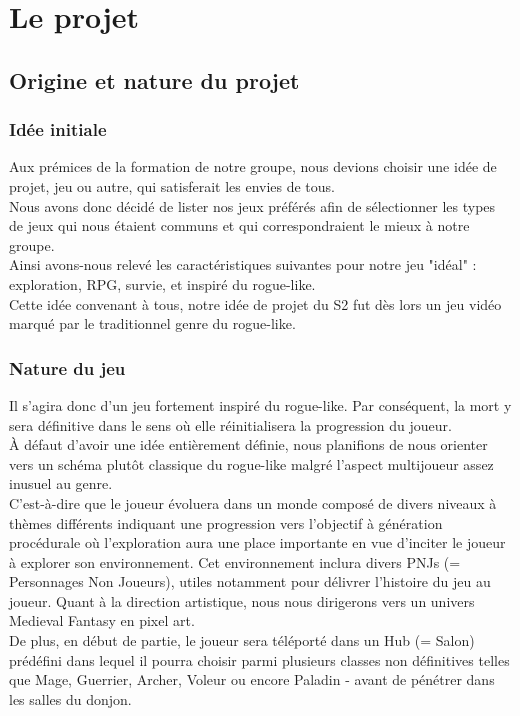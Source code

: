 \documentclass{article}
\begin{document}
\section{Le projet}

\subsection{Origine et nature du projet}


\subsubsection{Idée initiale}

Aux prémices de la formation de notre groupe, nous devions choisir une idée de projet, jeu ou autre, qui satisferait les envies de tous. \\
Nous avons donc décidé de lister nos jeux préférés afin de sélectionner les types de jeux qui nous étaient communs et qui correspondraient le mieux à notre groupe. \\
Ainsi avons-nous relevé les caractéristiques suivantes pour notre jeu "idéal" : exploration, RPG, survie, et inspiré du rogue-like. \\
Cette idée convenant à tous, notre idée de projet du S2 fut dès lors un jeu vidéo marqué par le traditionnel genre du rogue-like.

\subsubsection{Nature du jeu}

Il s'agira donc d'un jeu fortement inspiré du rogue-like.
Par conséquent, la mort y sera définitive dans le sens où elle réinitialisera la progression du joueur. \\
À défaut d'avoir une idée entièrement définie, nous planifions de nous orienter vers un schéma plutôt classique du rogue-like malgré l'aspect multijoueur assez inusuel au genre. \\
C'est-à-dire que le joueur évoluera dans un monde composé de divers niveaux à thèmes différents indiquant une progression vers l'objectif à génération procédurale où l'exploration aura une place importante en vue d'inciter le joueur à explorer son environnement. Cet environnement inclura divers PNJs (= Personnages Non Joueurs), utiles notamment pour délivrer l'histoire du jeu au joueur. Quant à la direction artistique, nous nous dirigerons vers un univers Medieval Fantasy en pixel art. \\
De plus, en début de partie, le joueur sera téléporté dans un Hub (= Salon) prédéfini dans lequel il pourra choisir parmi plusieurs classes non définitives telles que Mage, Guerrier, Archer, Voleur ou encore Paladin - avant de pénétrer dans les salles du donjon.
\end{document}
